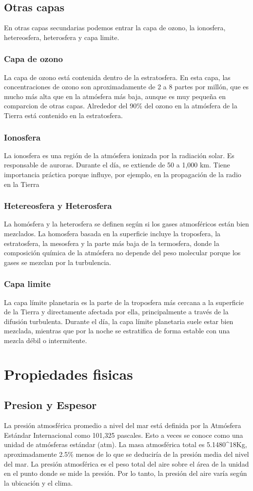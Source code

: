 \documentclass{article}
\begin{document}
\subsection{Otras capas}
En otras capas secundarias podemos entrar la capa de ozono, la ionosfera, hetereosfera, heterosfera y capa limite.
\subsubsection{Capa de ozono}
La capa de ozono está contenida dentro de la estratosfera. En esta capa, las concentraciones de ozono son aproximadamente de 2 a 8 partes por millón, que es mucho más alta que en la atmósfera más baja, aunque es muy pequeña en comparcion de otras capas. Alrededor del 90\% del ozono en la atmósfera de la Tierra está contenido en la estratosfera.
\subsubsection{Ionosfera}
La ionosfera es una región de la atmósfera ionizada por la radiación solar. Es responsable de auroras. Durante el día, se extiende de 50 a 1,000 km.  Tiene importancia práctica porque influye, por ejemplo, en la propagación de la radio en la Tierra
\subsubsection{Hetereosfera y Heterosfera}
La homósfera y la heterosfera se definen según si los gases atmosféricos están bien mezclados. La homosfera basada en la superficie incluye la troposfera, la estratosfera, la mesosfera y la parte más baja de la termosfera, donde la composición química de la atmósfera no depende del peso molecular porque los gases se mezclan por la turbulencia.
\subsubsection{Capa limite}

La capa límite planetaria es la parte de la troposfera más cercana a la superficie de la Tierra y directamente afectada por ella, principalmente a través de la difusión turbulenta. Durante el día, la capa límite planetaria suele estar bien mezclada, mientras que por la noche se estratifica de forma estable con una mezcla débil o intermitente.
\section{Propiedades fisicas}
\subsection{Presion y Espesor}
La presión atmosférica promedio a nivel del mar está definida por la Atmósfera Estándar Internacional como 101,325 pascales.  Esto a veces se conoce como una unidad de atmósferas estándar (atm). La masa atmosférica total es 5.1480\textasciicircum{18}Kg, aproximadamente 2.5\% menos de lo que se deduciría de la presión media del nivel del mar. La presión atmosférica es el peso total del aire sobre el área de la unidad en el punto donde se mide la presión. Por lo tanto, la presión del aire varía según la ubicación y el clima.
\end{document}
